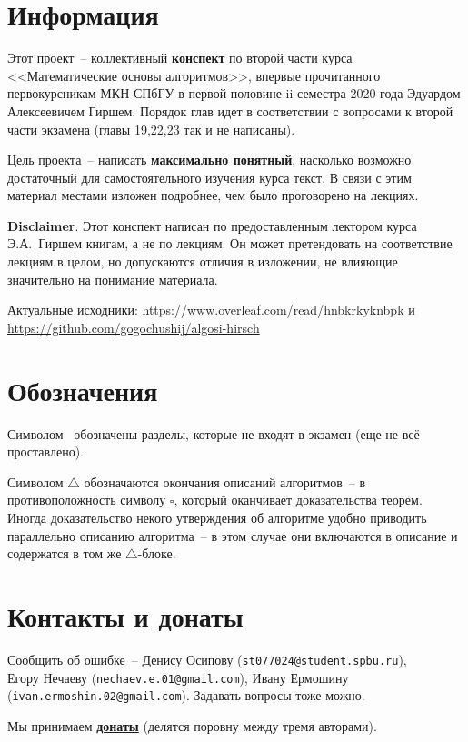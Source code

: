 \section*{Информация}

Этот проект~-- коллективный \textbf{конспект} по второй части курса <<Математические основы алгоритмов>>, впервые прочитанного первокурсникам МКН СПбГУ в первой половине ii семестра 2020 года Эдуардом Алексеевичем Гиршем. Порядок глав идет в соответствии с вопросами к второй части экзамена (главы 19,22,23 так и не написаны).

Цель проекта~--  написать \textbf{максимально понятный}, насколько возможно достаточный для самостоятельного изучения курса текст. В связи с этим материал местами изложен подробнее, чем было проговорено на лекциях.

\textbf{Disclaimer}. Этот конспект написан по предоставленным лектором курса Э.А.~Гиршем книгам, а не по лекциям. Он может претендовать на соответствие лекциям в целом, но допускаются отличия в изложении, не влияющие значительно на понимание материала.

Актуальные исходники: \url{https://www.overleaf.com/read/hnbkrkyknbpk} и \url{https://github.com/gogochushij/algosi-hirsch}

\section*{Обозначения}

Символом \heart~обозначены разделы, которые не входят в экзамен (еще не всё проставлено).

Символом $\bigtriangleup$ обозначаются окончания описаний алгоритмов~-- в противоположность символу $\square$, который оканчивает доказательства теорем. Иногда доказательство некого утверждения об алгоритме удобно приводить параллельно описанию алгоритма~-- в этом случае они включаются в описание и содержатся в том же $\bigtriangleup$-блоке.

\section*{Контакты и донаты}

Сообщить об ошибке~-- Денису Осипову (\texttt{st077024@student.spbu.ru}),\\ Егору Нечаеву (\texttt{nechaev.e.01@gmail.com}), Ивану Ермошину (\texttt{ivan.ermoshin.02@gmail.com}). Задавать вопросы тоже можно. 

\begin{center}
    Мы принимаем \textbf{\href{https://ko-fi.com/triangulation}{донаты}} (делятся поровну между тремя авторами).
\end{center}